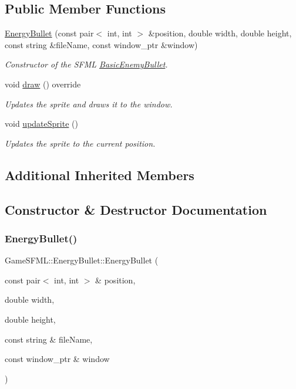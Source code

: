 \subsection*{Public Member Functions}
\begin{DoxyCompactItemize}
\item 
\hyperlink{classGameSFML_1_1EnergyBullet_a4f0effa64f046e9b71a28a4db78dbce7}{Energy\+Bullet} (const pair$<$ int, int $>$ \&position, double width, double height, const string \&file\+Name, const window\+\_\+ptr \&window)
\begin{DoxyCompactList}\small\item\em Constructor of the S\+F\+ML \hyperlink{classGameSFML_1_1BasicEnemyBullet}{Basic\+Enemy\+Bullet}. \end{DoxyCompactList}\item 
void \hyperlink{classGameSFML_1_1EnergyBullet_a41dd2b4aa08fb8af139870c29fa94c00}{draw} () override
\begin{DoxyCompactList}\small\item\em Updates the sprite and draws it to the window. \end{DoxyCompactList}\item 
void \hyperlink{classGameSFML_1_1EnergyBullet_a692e9ae4d828deec21e832986a734ca7}{update\+Sprite} ()
\begin{DoxyCompactList}\small\item\em Updates the sprite to the current position. \end{DoxyCompactList}\end{DoxyCompactItemize}
\subsection*{Additional Inherited Members}


\subsection{Constructor \& Destructor Documentation}
\mbox{\label{classGameSFML_1_1EnergyBullet_a4f0effa64f046e9b71a28a4db78dbce7}} 
\subsubsection{\texorpdfstring{Energy\+Bullet()}{EnergyBullet()}}
{\footnotesize\ttfamily Game\+S\+F\+M\+L\+::\+Energy\+Bullet\+::\+Energy\+Bullet (\begin{DoxyParamCaption}\item[{const pair$<$ int, int $>$ \&}]{position,  }\item[{double}]{width,  }\item[{double}]{height,  }\item[{const string \&}]{file\+Name,  }\item[{const window\+\_\+ptr \&}]{window }\end{DoxyParamCaption})}

